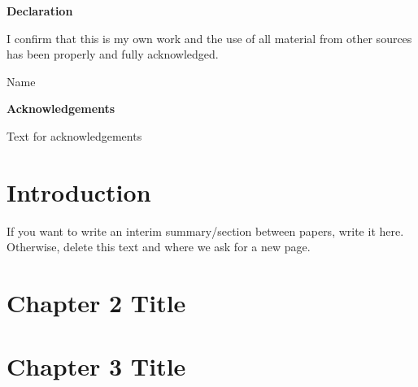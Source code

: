 \documentclass[11pt,twoside]{report} %
\begin{document}
\newpage
\thispagestyle{plain}
    \Huge
    \textbf{Declaration}
    
    \vspace{1cm}
    \large
   \noindent
    I confirm that this is my own work and the use of all material from other sources has been properly and fully acknowledged.
   
   
   
   \vspace{1 cm}
   \noindent
   Name
 

\newpage
\thispagestyle{plain}
    \Huge
    \textbf{Acknowledgements}
 
    \vspace{1cm}
    \large
    Text for acknowledgements
\tableofcontents{}

\listoffigures 
\listoftables 

\chapter{Introduction}


\newpage
If you want to write an interim summary/section between papers, write it here. Otherwise, delete this text and where we ask for a new page.

\chapter{Chapter 2 Title}



\chapter{Chapter 3 Title}

\end{document}
